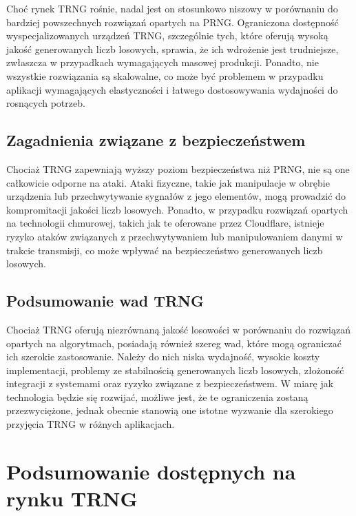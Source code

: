 Choć rynek TRNG rośnie, nadal jest on stosunkowo niszowy w porównaniu do bardziej powszechnych rozwiązań opartych na PRNG. Ograniczona dostępność wyspecjalizowanych urządzeń TRNG, szczególnie tych, które oferują wysoką jakość generowanych liczb losowych, sprawia, że ich wdrożenie jest trudniejsze, zwłaszcza w przypadkach wymagających masowej produkcji. Ponadto, nie wszystkie rozwiązania są skalowalne, co może być problemem w przypadku aplikacji wymagających elastyczności i łatwego dostosowywania wydajności do rosnących potrzeb.

\subsection{Zagadnienia związane z bezpieczeństwem}

Chociaż TRNG zapewniają wyższy poziom bezpieczeństwa niż PRNG, nie są one całkowicie odporne na ataki. Ataki fizyczne, takie jak manipulacje w obrębie urządzenia lub przechwytywanie sygnałów z jego elementów, mogą prowadzić do kompromitacji jakości liczb losowych. Ponadto, w przypadku rozwiązań opartych na technologii chmurowej, takich jak te oferowane przez Cloudflare, istnieje ryzyko ataków związanych z przechwytywaniem lub manipulowaniem danymi w trakcie transmisji, co może wpływać na bezpieczeństwo generowanych liczb losowych.

\subsection{Podsumowanie wad TRNG}

Chociaż TRNG oferują niezrównaną jakość losowości w porównaniu do rozwiązań opartych na algorytmach, posiadają również szereg wad, które mogą ograniczać ich szerokie zastosowanie. Należy do nich niska wydajność, wysokie koszty implementacji, problemy ze stabilnością generowanych liczb losowych, złożoność integracji z systemami oraz ryzyko związane z bezpieczeństwem. W miarę jak technologia będzie się rozwijać, możliwe jest, że te ograniczenia zostaną przezwyciężone, jednak obecnie stanowią one istotne wyzwanie dla szerokiego przyjęcia TRNG w różnych aplikacjach.

\section{Podsumowanie dostępnych na rynku TRNG}